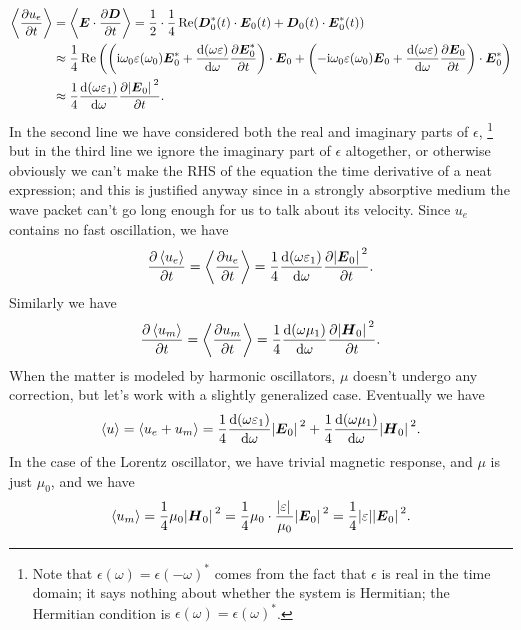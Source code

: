\documentclass[hyperref, a4paper]{article}
\newcommand*{\ii}{\mathrm{i}}
\begin{document}
\begin{equation}
    \begin{aligned}
        \expval{\pdv{u_e}{t}} &= \expval{\vb*{E} \cdot \pdv{\vb*{D}}{t}}
        = \frac{1}{2} \cdot \frac{1}{4} \Re (
            \vb*{D}_0^*(t) \cdot \vb*{E}_0(t)
            + \vb*{D}_0(t) \cdot \vb*{E}_0^*(t)
        ) \\
        &\approx \frac{1}{4} \Re \left(
            \left(
                \ii \omega_0 \varepsilon(\omega_0) \vb*{E}_0^* 
                + \dv{(\omega \varepsilon)}{\omega} \pdv{\vb*{E}_0^*}{t}
            \right)
             \cdot \vb*{E}_0 
            + \left(
                - \ii \omega_0 \varepsilon (\omega_0) \vb*{E}_0
                + \dv{(\omega \varepsilon)}{\omega} \pdv{\vb*{E}_0}{t} 
            \right)
            \cdot \vb*{E}_0^* 
        \right) \\
        &\approx \frac{1}{4} \dv{(\omega \varepsilon_1)}{\omega} \pdv{\abs*{\vb*{E}_0}^2}{t} .
    \end{aligned}
\end{equation}
In the second line we have considered 
both the real and imaginary parts of $\epsilon$,
\footnote{
    Note that $\epsilon(\omega) = \epsilon(- \omega)^*$
    comes from the fact that $\epsilon$ is real in the time domain;
    it says nothing about whether the system is Hermitian;
    the Hermitian condition is $\epsilon(\omega) = \epsilon(\omega)^*$.
} 
but in the third line we ignore the imaginary part of $\epsilon$ altogether, 
or otherwise obviously we can't make the RHS of the equation 
the time derivative of a neat expression; 
and this is justified anyway since in a strongly absorptive medium 
the wave packet can't go long enough 
for us to talk about its velocity.
Since $u_e$ contains no fast oscillation, we have 
\begin{equation}
    \pdv{\expval{u_e}}{t} = \expval{\pdv{u_e}{t}} 
    = \frac{1}{4} \dv{(\omega \varepsilon_1)}{\omega}
    \pdv{\abs*{\vb*{E}_0}^2}{t} .
\end{equation}
Similarly we have 
\begin{equation}
    \pdv{\expval{u_m}}{t} = \expval{\pdv{u_m}{t}} 
    = \frac{1}{4} \dv{(\omega \mu_1)}{\omega}
    \pdv{\abs*{\vb*{H}_0}^2}{t} .
\end{equation}
When the matter is modeled by harmonic oscillators, 
$\mu$ doesn't undergo any correction, 
but let's work with a slightly generalized case.
Eventually we have 
\begin{equation}
    \expval{u} = \expval{u_e + u_m} 
    = \frac{1}{4} \dv{(\omega \varepsilon_1)}{\omega}
    \abs*{\vb*{E}_0}^2 + 
    \frac{1}{4} \dv{(\omega \mu_1)}{\omega}
    \abs*{\vb*{H}_0}^2.
\end{equation}
In the case of the Lorentz oscillator, we have trivial magnetic response,
and $\mu$ is just $\mu_0$, and we have 
\begin{equation}
    \expval{u_m} = \frac{1}{4} \mu_0 \abs*{\vb*{H}_0}^2 
    = \frac{1}{4} \mu_0 \cdot \frac{\abs*{\varepsilon}}{\mu_0} \abs*{\vb*{E}_0}^2
    = \frac{1}{4} \abs{\varepsilon} \abs*{\vb*{E}_0}^2.
\end{equation}
\end{document}
